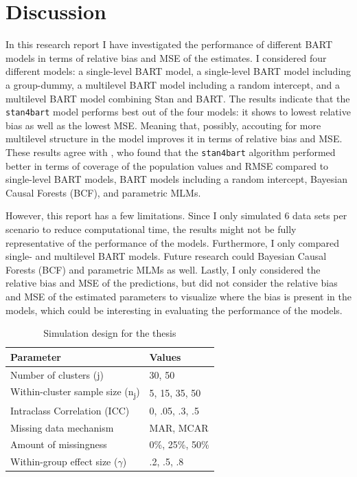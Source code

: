 \documentclass[10pt, a4paper, titlepage]{article}
\begin{document}
\newpage
\section{Discussion}

In this research report I have investigated the performance of different BART models in terms of relative bias and MSE of the estimates. I considered four different models: a single-level BART model, a single-level BART model including a group-dummy, a multilevel BART model including a random intercept, and a multilevel BART model combining Stan and BART. The results indicate that the \texttt{stan4bart} model performs best out of the four models: it shows to lowest relative bias as well as the lowest MSE. Meaning that, possibly, accouting for more multilevel structure in the model improves it in terms of relative bias and MSE. These results agree with \citet{dorie2022}, who found that the \texttt{stan4bart} algorithm performed better in terms of coverage of the population values and RMSE compared to single-level BART models, BART models including a random intercept, Bayesian Causal Forests (BCF), and parametric MLMs. %

However, this report has a few limitations. Since I only simulated 6 data sets per scenario to reduce computational time, the results might not be fully representative of the performance of the models. Furthermore, I only compared single- and multilevel BART models. Future research could Bayesian Causal Forests (BCF) and parametric MLMs as well. Lastly, I only considered the relative bias and MSE of the predictions, but did not consider the relative bias and MSE of the estimated parameters to visualize where the bias is present in the models, which could be interesting in evaluating the performance of the models.

\begin{table}
\centering
\caption{Simulation design for the thesis}
\label{tab:simulationparameters2}
\begin{tabular}{l|l}
\textbf{Parameter}                                  & \textbf{Values} \\ \hline
Number of clusters (j)                              & 30, 50          \\
Within-cluster sample size (n\textsubscript{j})     & 5, 15, 35, 50   \\
Intraclass Correlation (ICC)                        & 0, .05, .3, .5  \\
Missing data mechanism                              & MAR, MCAR       \\
Amount of missingness                               & 0\%, 25\%, 50\% \\
Within-group effect size ($\gamma$)                 & .2, .5, .8
\end{tabular}
\end{table}
\end{document}
